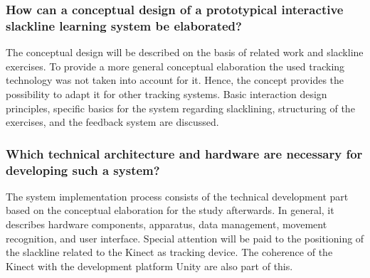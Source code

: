\subsubsection{How can a conceptual design of a prototypical interactive slackline learning system be elaborated?}\label{rq_concept}
The conceptual design will be described on the basis of related work and slackline exercises.
To provide a more general conceptual elaboration the used tracking technology was not taken into account for it.
Hence, the concept provides the possibility to adapt it for other tracking systems.
Basic interaction design principles, specific basics for the system regarding slacklining, structuring of the exercises, and the feedback system are discussed.

\subsubsection{Which technical architecture and hardware are necessary for developing such a system?}\label{rq_development}
The system implementation process consists of the technical development part based on the conceptual elaboration for the study afterwards.
In general, it describes hardware components, apparatus, data management, movement recognition, and user interface.
Special attention will be paid to the positioning of the slackline related to the Kinect as tracking device.
The coherence of the Kinect with the development platform Unity are also part of this.

